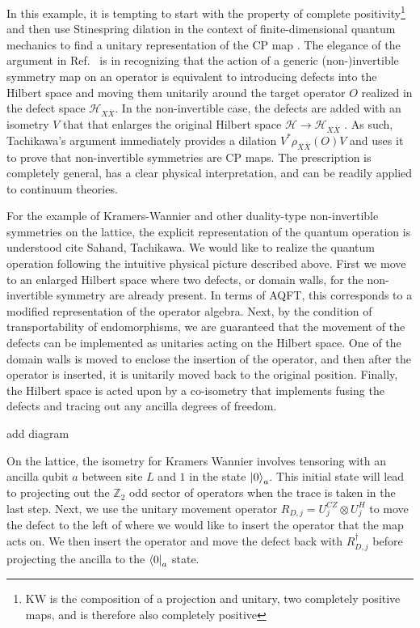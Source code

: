 \documentclass{article}
\theoremstyle{definition}
\begin{document}
  In this example, it is tempting to start with the property of complete
  positivity\footnote{$\mathrm{KW}$ is the composition of a projection and
  unitary, two completely positive maps, and is therefore also completely
  positive} and then use Stinespring dilation in the context of finite-dimensional
  quantum mechanics to find a unitary representation of the CP map . The elegance
  of the argument in Ref.~\cite{tachikawa2024noninvertiblysymmetryquantumoperations}
  is in recognizing that the action of a generic (non-)invertible symmetry map
  on an operator is equivalent to introducing defects into the Hilbert space and
  moving them unitarily around the target operator $O$ realized in the defect
  space $\mathcal{H}_{X\overline{X}}$. In the non-invertible case, the defects
  are added with an isometry $V$ that that enlarges the original Hilbert space
  $\mathcal{H}\rightarrow \mathcal{H}_{X\overline{X}}$ . As such, Tachikawa's argument
  immediately provides a dilation $V^{*}\rho_{X\overline{X}}(O)V$ and uses it to
  prove that non-invertible symmetries are CP maps. The prescription is
  completely general, has a clear physical interpretation, and can be readily
  applied to continuum theories. 

  For the example of Kramers-Wannier and other duality-type non-invertible symmetries on the lattice, the explicit representation of the quantum operation is understood\color{brown} cite Sahand, Tachikawa\color{black}.  We would like to realize the quantum operation following the intuitive physical picture described above.  First we move to an enlarged Hilbert space where two defects, or domain walls, for the non-invertible symmetry are already present.  In terms of AQFT, this corresponds to a modified representation of the operator algebra.  Next, by the condition of transportability of endomorphisms, we are guaranteed that the movement of the defects can be implemented as unitaries acting on the Hilbert space.  One of the domain walls is moved to enclose the insertion of the operator, and then after the operator is inserted, it is unitarily moved back to the original position.  Finally, the Hilbert space is acted upon by a co-isometry that implements fusing the defects and tracing out any ancilla degrees of freedom.  

  \color{brown}add diagram \color{black}

  On the lattice, the isometry for Kramers Wannier involves tensoring with an ancilla qubit $a$ between site $L$ and $1$ in the state $\ket{0}_a$.  This initial state will lead to projecting out the $\mathbb{Z}_2$ odd sector of operators when the trace is taken in the last step.  Next, we use the unitary movement operator $R_{D,j} = U_j^{CZ}\otimes U_j^H$ to move the defect to the left of where we would like to insert the operator that the map acts on.  We then insert the operator and move the defect back with $R_{D,j}^\dagger$ before projecting the ancilla to the $\bra{0}_a$ state.
\end{document}
